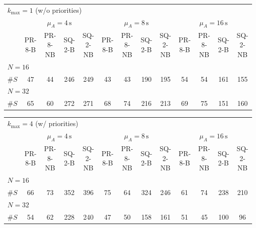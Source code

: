 \begin{tabular}{l c c c c c c c c c c c c}
\toprule
\multicolumn{13}{l}{$k_{\max}=1$ (w/o priorities)} \\
\addlinespace[0.2em]
 & \multicolumn{4}{c}{$\mu_A=4\,\mathrm{s}$} & \multicolumn{4}{c}{$\mu_A=8\,\mathrm{s}$} & \multicolumn{4}{c}{$\mu_A=16\,\mathrm{s}$} \\
\cmidrule(lr){2-5}\cmidrule(lr){6-9}\cmidrule(lr){10-13}
 & PR-8-B & PR-8-NB & SQ-2-B & SQ-2-NB & PR-8-B & PR-8-NB & SQ-2-B & SQ-2-NB & PR-8-B & PR-8-NB & SQ-2-B & SQ-2-NB \\
\midrule
\multicolumn{13}{l}{${N=16}$} \\
\midrule
$\#S$ & 47 & 44 & 246 & 249 & 43 & 43 & 190 & 195 & 54 & 54 & 161 & 155 \\
\midrule
\multicolumn{13}{l}{${N=32}$} \\
\midrule
$\#S$ & 65 & 60 & 272 & 271 & 68 & 74 & 216 & 213 & 69 & 75 & 151 & 160 \\
\bottomrule
\end{tabular}

\begin{tabular}{l c c c c c c c c c c c c}
\toprule
\multicolumn{13}{l}{$k_{\max}=4$ (w/ priorities)} \\
\addlinespace[0.2em]
 & \multicolumn{4}{c}{$\mu_A=4\,\mathrm{s}$} & \multicolumn{4}{c}{$\mu_A=8\,\mathrm{s}$} & \multicolumn{4}{c}{$\mu_A=16\,\mathrm{s}$} \\
\cmidrule(lr){2-5}\cmidrule(lr){6-9}\cmidrule(lr){10-13}
 & PR-8-B & PR-8-NB & SQ-2-B & SQ-2-NB & PR-8-B & PR-8-NB & SQ-2-B & SQ-2-NB & PR-8-B & PR-8-NB & SQ-2-B & SQ-2-NB \\
\midrule
\multicolumn{13}{l}{${N=16}$} \\
\midrule
$\#S$ & 66 & 73 & 352 & 396 & 75 & 64 & 324 & 246 & 61 & 74 & 238 & 210 \\
\midrule
\multicolumn{13}{l}{${N=32}$} \\
\midrule
$\#S$ & 54 & 62 & 228 & 240 & 47 & 50 & 158 & 161 & 51 & 45 & 100 & 96 \\
\bottomrule
\end{tabular}
